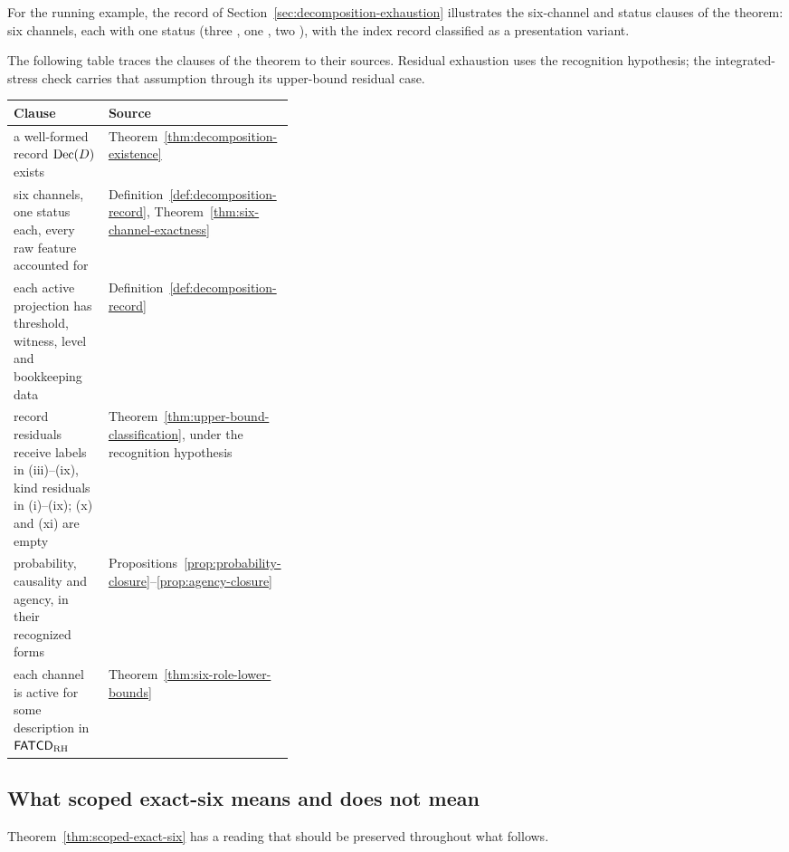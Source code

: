 For the running example, the record of Section~\ref{sec:decomposition-exhaustion}
illustrates the six-channel and status clauses of the theorem: six channels,
each with one status (three \activeproj{}, one \belowthr{}, two
\absentrec{}), with the index record classified as a presentation variant.

The following table traces the clauses of the theorem to their sources.
Residual exhaustion uses the recognition hypothesis; the integrated-stress check
carries that assumption through its upper-bound residual case.
\begin{center}
\small
\begin{tabularx}{\linewidth}{@{}>{\raggedright\arraybackslash}X>{\raggedright\arraybackslash}p{0.36\linewidth}@{}}
\toprule
Clause & Source \\
\midrule
a well-formed record \(\operatorname{Dec}\!\left(D\right)\) exists & Theorem~\ref{thm:decomposition-existence} \\
six channels, one status each, every raw feature accounted for & Definition~\ref{def:decomposition-record}, Theorem~\ref{thm:six-channel-exactness} \\
each active projection has threshold, witness, level and bookkeeping data & Definition~\ref{def:decomposition-record} \\
record residuals receive labels in (iii)--(ix), kind residuals in (i)--(ix); (x) and (xi) are empty & Theorem~\ref{thm:upper-bound-classification}, under the recognition hypothesis \\
probability, causality and agency, in their recognized forms & Propositions~\ref{prop:probability-closure}--\ref{prop:agency-closure} \\
each channel is active for some description in \(\mathsf{FATCD}_{\mathrm{RH}}\) & Theorem~\ref{thm:six-role-lower-bounds} \\
\bottomrule
\end{tabularx}
\end{center}

\subsection{What scoped exact-six means and does not mean}\label{subsec:exact-six-meaning}

Theorem~\ref{thm:scoped-exact-six} has a reading that should be
preserved throughout what follows.

